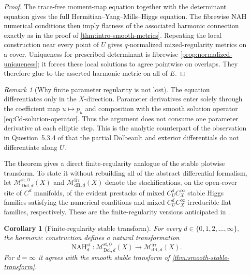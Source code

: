 \documentclass[11pt,reqno]{amsart}
\newtheorem{corollary}[theorem]{Corollary}
\theoremstyle{definition}
\theoremstyle{remark}
\newtheorem{remark}[theorem]{Remark}
\newcommand{\Dol}{\mathrm{Dol}}
\newcommand{\dR}{\mathrm{dR}}
\newcommand{\st}{\mathrm{st}}
\newcommand{\irr}{\mathrm{irr}}
\begin{document}
\begin{proof}
The trace-free moment-map equation together with the determinant equation gives the full Hermitian--Yang--Mills--Higgs equation.  The fibrewise NAH numerical conditions then imply flatness of the associated harmonic connection exactly as in the proof of \cref{thm:intro-smooth-metrics}.  Repeating the local construction near every point of $U$ gives $q$-normalized mixed-regularity metrics on a cover.  Uniqueness for prescribed determinant is fibrewise \cref{prop:normalized-uniqueness}; it forces these local solutions to agree pointwise on overlaps.  They therefore glue to the asserted harmonic metric on all of $E$.
\end{proof}

\begin{remark}[Why finite parameter regularity is not lost]\label{rem:no-loss-Cd}
The equation differentiates only in the $X$-direction.  Parameter derivatives enter solely through the coefficient map $u\mapsto p_u$ and composition with the smooth solution operator \eqref{eq:Cd-solution-operator}.  Thus the argument does not consume one parameter derivative at each elliptic step.  This is the analytic counterpart of the observation in Question~5.3.4 of \cite{AzamRayan2026} that the partial Dolbeault and exterior differentials do not differentiate along $U$.
\end{remark}

The theorem gives a direct finite-regularity analogue of the stable plotwise transform.  To state it without rebuilding all of the abstract differential formalism, let $\mathscr M_{\Dol,d}^{\st,0}(X)$ and $\mathscr M_{\dR,d}^{\irr}(X)$ denote the stackifications, on the open-cover site of $C^d$ manifolds, of the evident prestacks of mixed $C^d_UC^\infty_X$ stable Higgs families satisfying the numerical conditions and mixed $C^d_UC^\infty_X$ irreducible flat families, respectively.  These are the finite-regularity versions anticipated in \cite[Question~5.3.4]{AzamRayan2026}.

\begin{corollary}[Finite-regularity stable transform]\label{cor:Cd-stable-transform}
For every $d\in\{0,1,2,\ldots,\infty\}$, the harmonic construction defines a natural transformation
\[
  \operatorname{NAH}^{\st}_d:
  \mathscr M_{\Dol,d}^{\st,0}(X)
  \longrightarrow
  \mathscr M_{\dR,d}^{\irr}(X).
\]
For $d=\infty$ it agrees with the smooth stable transform of \cref{thm:smooth-stable-transform}.
\end{corollary}
\end{document}
